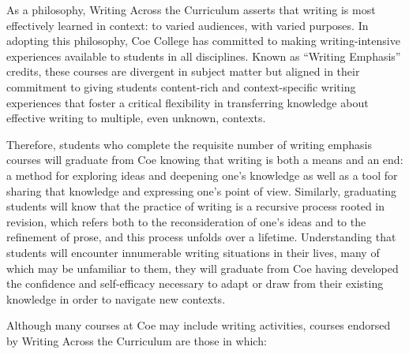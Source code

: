 \documentclass[
  letterpaper,
]{scrbook}
\begin{document}
As a philosophy, Writing Across the Curriculum asserts that writing is
most effectively learned in context: to varied audiences, with varied
purposes. In adopting this philosophy, Coe College has committed to
making writing-intensive experiences available to students in all
disciplines. Known as ``Writing Emphasis'' credits, these courses are
divergent in subject matter but aligned in their commitment to giving
students content-rich and context-specific writing experiences that
foster a critical flexibility in transferring knowledge about effective
writing to multiple, even unknown, contexts.

Therefore, students who complete the requisite number of writing
emphasis courses will graduate from Coe knowing that writing is both a
means and an end: a method for exploring ideas and deepening one's
knowledge as well as a tool for sharing that knowledge and expressing
one's point of view. Similarly, graduating students will know that the
practice of writing is a recursive process rooted in revision, which
refers both to the reconsideration of one's ideas and to the refinement
of prose, and this process unfolds over a lifetime. Understanding that
students will encounter innumerable writing situations in their lives,
many of which may be unfamiliar to them, they will graduate from Coe
having developed the confidence and self-efficacy necessary to adapt or
draw from their existing knowledge in order to navigate new contexts.

Although many courses at Coe may include writing activities, courses
endorsed by Writing Across the Curriculum are those in which:
\end{document}

